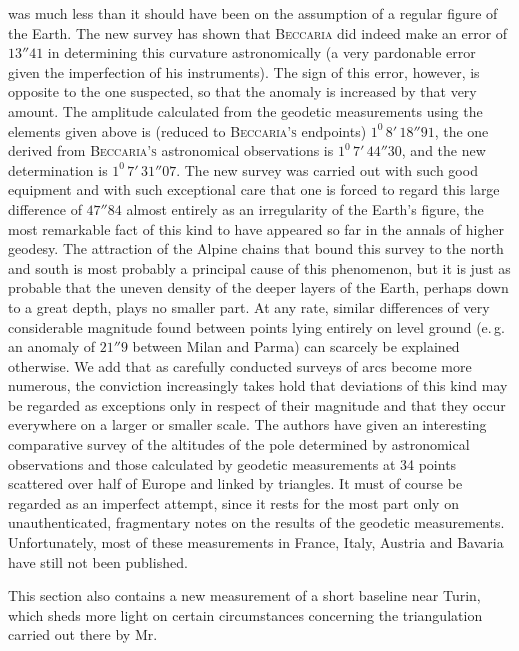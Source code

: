 %
was much less than it should have been on the assumption of a regular figure of the Earth. The new survey has shown that \textsc{Beccaria} did indeed make an error of \(13''41\) in determining this curvature astronomically (a very pardonable error given the imperfection of his instruments). The sign of this error, however, is opposite to the one suspected, so that the anomaly is increased by that very amount. The amplitude calculated from the geodetic measurements using the elements given above is (reduced to \textsc{Beccaria's} endpoints) \(1^0\,8'\,18''91\), the one derived from \textsc{Beccaria's} astronomical observations is \(1^0\,7'\,44''30\), and the new determination is \(1^0\,7'\,31''07\). The new survey was carried out with such good equipment and with such exceptional care that one is forced to regard this large difference of \(47''84\) almost entirely as an irregularity of the Earth's figure, the most remarkable fact of this kind to have appeared so far in the annals of higher geodesy. The attraction of the Alpine chains that bound this survey to the north and south is most probably a principal cause of this phenomenon, but it is just as probable that the uneven density of the deeper layers of the Earth, perhaps down to a great depth, plays no smaller part. At any rate, similar differences of very considerable magnitude found between points lying entirely on level ground (e.\,g. an anomaly of \(21''9\) between Milan and Parma) can scarcely be explained otherwise. We add that as carefully conducted surveys of arcs become more numerous, the conviction increasingly takes hold that deviations of this kind may be regarded as exceptions only in respect of their magnitude and that they occur everywhere on a larger or smaller scale. The authors have given an interesting comparative survey of the altitudes of the pole determined by astronomical observations and those calculated by geodetic measurements at 34 points scattered over half of Europe and linked by triangles. It must of course be regarded as an imperfect attempt, since it rests for the most part only on unauthenticated, fragmentary notes on the results of the geodetic measurements. Unfortunately, most of these measurements in France, Italy, Austria and Bavaria have still not been published.

This section also contains a new measurement of a short baseline near Turin, which sheds more light on certain circumstances concerning the triangulation carried out there by Mr.~%
